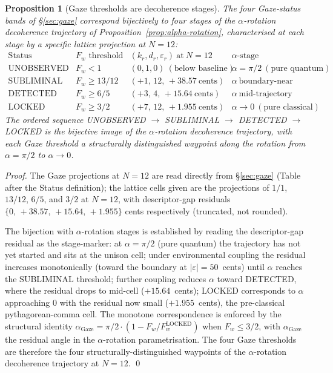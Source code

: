 \documentclass[11pt,a4paper]{article}
\newtheorem{proposition}[theorem]{Proposition}
\theoremstyle{definition}
\theoremstyle{remark}
\begin{document}
\begin{proposition}[Gaze thresholds are decoherence stages]\label{prop:gaze-decoherence}
The four Gaze-status bands of \S\ref{sec:gaze} correspond bijectively to four stages of the $\alpha$-rotation decoherence trajectory of Proposition~\ref{prop:alpha-rotation}, characterised at each stage by a specific lattice projection at $N=12$:
\[
\begin{array}{l|l|l|l}
\text{Status} & F_{w} \text{ threshold} & (k_{r},d_{r},\varepsilon_{r})~\text{at}~N=12 & \alpha\text{-stage characterisation} \\ \hline
\text{UNOBSERVED} & F_{w} < 1 & (0,1,0)~(\text{below baseline}) & \alpha = \pi/2~(\text{pure quantum}) \\
\text{SUBLIMINAL} & F_{w} \ge 13/12 & (+1,\,12,\,+38.57~\text{cents}) & \alpha~\text{boundary-near} \\
\text{DETECTED} & F_{w} \ge 6/5 & (+3,\,4,\,+15.64~\text{cents}) & \alpha~\text{mid-trajectory} \\
\text{LOCKED} & F_{w} \ge 3/2 & (+7,\,12,\,+1.955~\text{cents}) & \alpha \to 0~(\text{pure classical})
\end{array}
\]
The ordered sequence UNOBSERVED $\to$ SUBLIMINAL $\to$ DETECTED $\to$ LOCKED is the bijective image of the $\alpha$-rotation decoherence trajectory, with each Gaze threshold a structurally distinguished waypoint along the rotation from $\alpha = \pi/2$ to $\alpha \to 0$.
\end{proposition}

\begin{proof}
The Gaze projections at $N=12$ are read directly from \S\ref{sec:gaze} (Table after the Status definition); the lattice cells given are the projections of $1/1$, $13/12$, $6/5$, and $3/2$ at $N=12$, with descriptor-gap residuals $\{0,\,+38.57,\,+15.64,\,+1.955\}$ cents respectively (truncated, not rounded).

The bijection with $\alpha$-rotation stages is established by reading the descriptor-gap residual as the stage-marker: at $\alpha = \pi/2$ (pure quantum) the trajectory has not yet started and sits at the unison cell; under environmental coupling the residual increases monotonically (toward the boundary at $|\varepsilon|=50$~cents) until $\alpha$ reaches the SUBLIMINAL threshold; further coupling reduces $\alpha$ toward DETECTED, where the residual drops to mid-cell ($+15.64$~cents); LOCKED corresponds to $\alpha$ approaching $0$ with the residual now small ($+1.955$~cents), the pre-classical pythagorean-comma cell. The monotone correspondence is enforced by the structural identity $\alpha_{\text{Gaze}} = \pi/2 \cdot (1 - F_{w}/F_{w}^{\text{LOCKED}})$ when $F_{w} \le 3/2$, with $\alpha_{\text{Gaze}}$ the residual angle in the $\alpha$-rotation parametrisation. The four Gaze thresholds are therefore the four structurally-distinguished waypoints of the $\alpha$-rotation decoherence trajectory at $N=12$. \qed
\end{proof}
\end{document}
